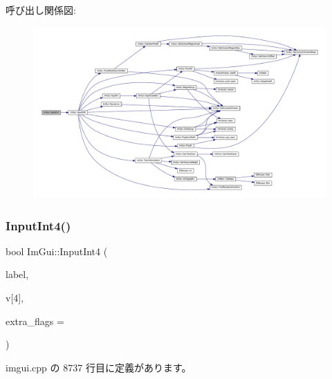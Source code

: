 呼び出し関係図\+:\nopagebreak
\begin{figure}[H]
\begin{center}
\leavevmode
\includegraphics[width=350pt]{namespace_im_gui_ab02fc4a19ed153984d3585296e1c74b1_cgraph}
\end{center}
\end{figure}
\mbox{\label{namespace_im_gui_ac714ecf202c82dc6caa0cbf344c85a13}} 
\subsubsection{\texorpdfstring{Input\+Int4()}{InputInt4()}}
{\footnotesize\ttfamily bool Im\+Gui\+::\+Input\+Int4 (\begin{DoxyParamCaption}\item[{const char $\ast$}]{label,  }\item[{int}]{v\mbox{[}4\mbox{]},  }\item[{\mbox{\hyperlink{imgui_8h_a7d2c6153a6b9b5d3178ce82434ac9fb8}{Im\+Gui\+Input\+Text\+Flags}}}]{extra\+\_\+flags = {} }\end{DoxyParamCaption})}



 imgui.\+cpp の 8737 行目に定義があります。


